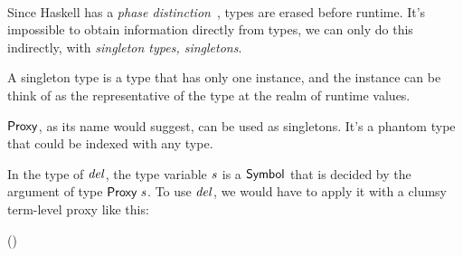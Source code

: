 \begin{hscode}\SaveRestoreHook
{}%
%
\>[B]{}\mathbin{::}\;\Rightarrow {}\;\to {}\<[E]%
\\
\>[B]{}\mathrel{=}\mathbin{\cdot}\<[E]%
\ColumnHook
\end{hscode}\resethooks

Since Haskell has a \emph{phase distinction}~\cite{phasedistinction}, types are
 erased before runtime. It's impossible to obtain information directly from
 types, we can only do this indirectly, with
 \emph{singleton types, singletons}.

A singleton type is a type that has only one instance, and the instance can be
 think of as the representative of the type at the realm of runtime values.

\ensuremath{\Conid{Proxy}}, as its name would suggest, can be used as
 singletons. It's a phantom type that could be indexed with any type.

\begin{hscode}\SaveRestoreHook
{}%
%
\>[B]{}\;\;\mathrel{=}\<[E]%
\ColumnHook
\end{hscode}\resethooks

In the type of \ensuremath{\Varid{del}}, the type variable
 \ensuremath{\Varid{s}} is a \ensuremath{\Conid{Symbol}} that is decided by
 the argument of type \ensuremath{\Conid{Proxy}\;\Varid{s}}.
 To use \ensuremath{\Varid{del}}, we would have to apply it with a clumsy
 term-level proxy like this:

\begin{hscode}\SaveRestoreHook
{}%
%
\>[B]{}\;(\mathbin{::}\;){}\<[E]%
\ColumnHook
\end{hscode}\resethooks
